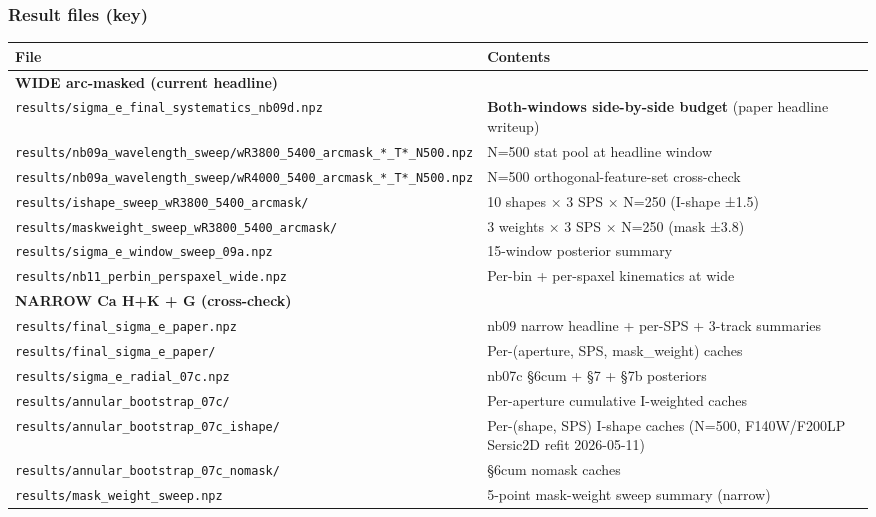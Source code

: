 \documentclass[
  10pt,
]{article}
\begin{document}
\hypertarget{result-files-key}{%
\subsubsection{Result files (key)}\label{result-files-key}}

\begingroup\small\setlength{\tabcolsep}{4pt}\begin{longtable}[]{@{}ll@{}}
\toprule
File & Contents \\
\midrule
\endhead
\textbf{WIDE arc-masked (current headline)} & \\
\texttt{results/sigma\_e\_final\_systematics\_nb09d.npz} & \textbf{Both-windows side-by-side budget} (paper headline writeup) \\
\texttt{results/nb09a\_wavelength\_sweep/wR3800\_5400\_arcmask\_*\_T*\_N500.npz} & N=500 stat pool at headline window \\
\texttt{results/nb09a\_wavelength\_sweep/wR4000\_5400\_arcmask\_*\_T*\_N500.npz} & N=500 orthogonal-feature-set cross-check \\
\texttt{results/ishape\_sweep\_wR3800\_5400\_arcmask/} & 10 shapes × 3 SPS × N=250 (I-shape ±1.5) \\
\texttt{results/maskweight\_sweep\_wR3800\_5400\_arcmask/} & 3 weights × 3 SPS × N=250 (mask ±3.8) \\
\texttt{results/sigma\_e\_window\_sweep\_09a.npz} & 15-window posterior summary \\
\texttt{results/nb11\_perbin\_perspaxel\_wide.npz} & Per-bin + per-spaxel kinematics at wide \\
\textbf{NARROW Ca H+K + G (cross-check)} & \\
\texttt{results/final\_sigma\_e\_paper.npz} & nb09 narrow headline + per-SPS + 3-track summaries \\
\texttt{results/final\_sigma\_e\_paper/} & Per-(aperture, SPS, mask\_weight) caches \\
\texttt{results/sigma\_e\_radial\_07c.npz} & nb07c §6cum + §7 + §7b posteriors \\
\texttt{results/annular\_bootstrap\_07c/} & Per-aperture cumulative I-weighted caches \\
\texttt{results/annular\_bootstrap\_07c\_ishape/} & Per-(shape, SPS) I-shape caches (N=500, F140W/F200LP Sersic2D refit 2026-05-11) \\
\texttt{results/annular\_bootstrap\_07c\_nomask/} & §6cum nomask caches \\
\texttt{results/mask\_weight\_sweep.npz} & 5-point mask-weight sweep summary (narrow) \\

\end{longtable}
\end{document}
